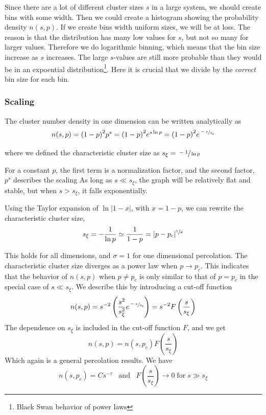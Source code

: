 \documentclass[11pt]{article}
\numberwithin{equation}{section}
\numberwithin{figure}{section}
\newcommand{\ita}[1]{\textit{#1}}
\begin{document}
Since there are a lot of different cluster sizes $s$ in a large system,
we should create bins with some width. Then we could create a histogram
showing the probability density $n(s,p)$.
If we create bins width uniform sizes, we will be at loss.
The reason is that the distribution has many low values for $s$,
but not so many for larger values. Therefore we do logarithmic binning,
which means that the bin size increase as $s$ increases.
The large $s$-values are still more probable than they would be in an
expoential distribution\footnote{Black Swan behavior of power laws}.
Here it is crucial that we divide by the \ita{correct} bin size for
each bin.

\subsubsection{Scaling}
The cluster number density in one dimension can
be written analytically as
\begin{equation}
    n(s,p) = {(1-p)}^2 p^s = {(1-p)}^2 e^{s \ln p}
    = {(1-p)}^2 e^{\sfrac{-s}{s_\xi}}
\end{equation}

where we defined the characteristic cluster size as
$s_\xi = \sfrac{-1}{\ln p}$

For a constant $p$, the first term is a normalization factor,
and the second factor, $p^s$ describes the scaling
As long as $s\ll s_\xi$, the graph will be relatively flat and stable,
but when $s > s_\xi$, it falls exponentially.

Using the Taylor expansion of $\ln |1-x|$, with $x = 1-p$,
we can rewrite the characteristic cluster size,
\begin{equation}
    s_\xi = -\frac{1}{\ln p} \simeq \frac{1}{1-p} 
    = |p-p_c|^{\sfrac{1}{\sigma}}
\end{equation}

This holds for all dimensions, and $\sigma = 1$ for one dimensional
percolation.
The characteristic cluster size diverges as a power law when
$p\rightarrow p_c$. This indicates that the behavior of
$n(s,p)$ when $p\neq p_c$ is only similar to that of
$p=p_c$ in the special case of $s \ll s_\xi$.
We describe this by introducing a cut-off function
\begin{equation}
    n(s,p) = s^{-2} \left( \frac{s^2}{s^2_\xi} e^{\sfrac{-s}{s_\xi}} 
    \right)
    = s^{-2} F\left( \frac{s}{s_\xi}\right)
\end{equation}
The dependence on $s_\xi$ is included in the cut-off function $F$,
and we get
\begin{equation}
    n(s,p) = n(s,p_c)F\left(\frac{s}{s_\xi}\right)
\end{equation}
Which again is a general percolation results.
We have
\begin{equation}
    n(s,p_c) = Cs^{-\tau} \;\;\; \text{and} \;\;\;
    F\left( \frac{s}{s_\xi}\right)\rightarrow
    0\; \text{for}\; s \gg s_\xi
\end{equation}
\end{document}
